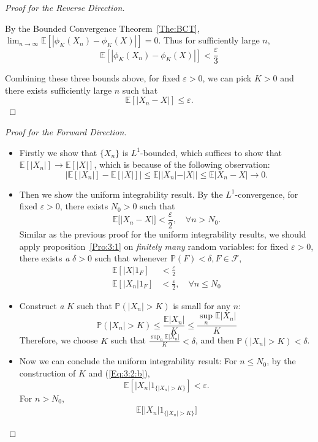 \begin{proof}[Proof for the Reverse Direction]
\begin{itemize}
By the Bounded Convergence Theorem~\ref{The:BCT}, $\lim_{n\to\infty}\mathbb{E}[|\phi_K(X_n) - \phi_K(X)|]=0$.
Thus for sufficiently large $n$,
\[
\mathbb{E}[|\phi_K(X_n) - \phi_K(X)|]<\frac{\varepsilon}{3}
\]
\end{itemize}
Combining these three bounds above, for fixed $\varepsilon>0$, we can pick $K>0$ and there exists sufficiently large $n$ such that 
\[
\mathbb{E}[|X_n-X|]\le\varepsilon.
\]
\end{proof}

\begin{proof}[Proof for the Forward Direction]
\begin{itemize}
\item
Firstly we show that $\{X_n\}$ is $L^1$-bounded, which suffices to show that 
$\mathbb{E}[|X_n|]\to\mathbb{E}[|X|]$, which is because of the following observation:
\[
\bigg|
\mathbb{E}[|X_n|]-\mathbb{E}[|X|]
\bigg|
\le\mathbb{E}||X_n| - |X||\le \mathbb{E}|X_n-X|\to0.
\]
\item
Then we show the uniform integrability result. By the $L^1$-convergence, for fixed $\varepsilon>0$, there exists $N_0>0$ such that 
\[
\mathbb{E}\bigg[
|X_n-X|
\bigg]<\frac{\varepsilon}{2},\quad\forall n>N_0.
\]
Similar as the previous proof for the uniform integrability results, we should apply proposition~\ref{Pro:3:1} on \textit{finitely many} random variables:
for fixed $\varepsilon>0$, there exists \emph{a} $\delta>0$ such that whenever $\mathbb{P}(F)<\delta, F\in\mathcal{F}$,
\begin{subequations}
\begin{align}
\mathbb{E}[
|X|1_F
]&<\frac{\varepsilon}{2}\label{Eq:3:2:a}\\
\mathbb{E}[
|X_n|1_F
]&<\frac{\varepsilon}{2},\quad\forall n\le N_0\label{Eq:3:2:b}
\end{align}
\end{subequations}
\item
Construct \emph{a} $K$ such that $\mathbb{P}(|X_n|>K)$ is small for any $n$:
\[
\mathbb{P}(|X_n|>K)\le\frac{\mathbb{E}|X_n|}{K}\le \frac{\sup_{n}\mathbb{E}|X_n|}{K}
\]
Therefore, we choose $K$ such that $\frac{\sup_{n}\mathbb{E}|X_n|}{K}<\delta$, and then 
$\mathbb{P}(|X_n|>K)<\delta$.
\item
Now we can conclude the uniform integrability result:
For $n\le N_0$, by the construction of $K$ and (\eqref{Eq:3:2:b}),
\[
\mathbb{E}[
|X_n|1_{\{|X_n|>K\}}
]<\varepsilon.
\]
For $n>N_0$,
\begin{align*}
\mathbb{E}\bigg[
|X_n|1_{\{|X_n|>K\}}
\bigg]

\end{align*}
\end{itemize}
\end{proof}
